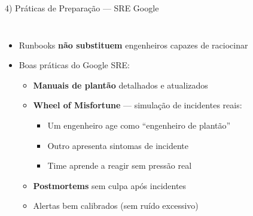 \documentclass[aspectratio=169]{beamer}
\begin{document}
\begin{frame}{4) Práticas de Preparação — SRE Google}

  \begin{columns}[T]
\begin{itemize}
  \item Runbooks \textbf{não substituem} engenheiros capazes de raciocinar

  \item Boas práticas do Google SRE:
    \begin{itemize}

      \item \textbf{Manuais de plantão} detalhados e atualizados

      \item \textbf{Wheel of Misfortune} — simulação de incidentes reais:
        \begin{itemize}
          \item Um engenheiro age como ``engenheiro de plantão''
          \item Outro apresenta sintomas de incidente
          \item Time aprende a reagir sem pressão real
        \end{itemize}

      \item \textbf{Postmortems} sem culpa após incidentes

      \item Alertas bem calibrados (sem ruído excessivo)

    \end{itemize}

\end{itemize}

      \centering
  \end{columns}
\end{frame}
\end{document}
